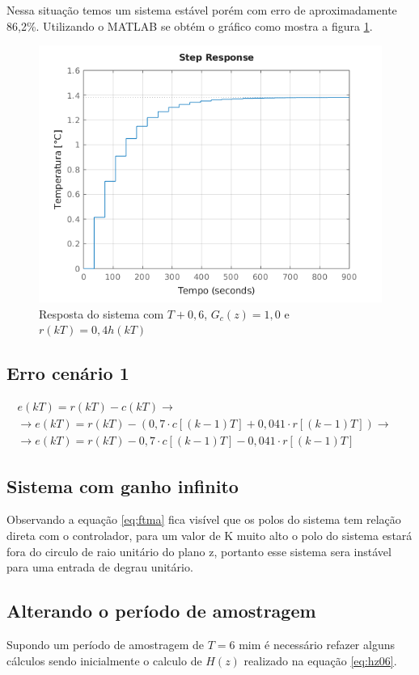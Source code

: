 \documentclass[a4paper,12pt]{article}
\begin{document}
			Nessa situação temos um sistema estável porém com erro de aproximadamente 86,2\%. Utilizando o MATLAB se obtém o gráfico como mostra a figura \ref{fig:resp_2_4}.
			

			\begin{figure}[H]
				\centering
				\includegraphics[width=0.6\linewidth]{images/resp2d.png}
				\caption{Resposta do sistema com $T+0,6$, $G_c(z)=1,0$ e $r(kT) = 0,4 h(kT)$}
				\label{fig:resp_2_4}
			\end{figure}
			
		\subsection{Erro cenário 1}
			
			\begin{equation}
				\left.
				\begin{array}{c}
					\displaystyle e(kT) = r(kT) - c(kT) \rightarrow \\[20pt]
					\displaystyle \rightarrow e(kT) = r(kT) - (0,7\cdot c[(k-1)T] + 0,041 \cdot r[(k-1)T]) \rightarrow \\[20pt]
					\displaystyle \rightarrow e(kT) = r(kT) - 0,7 \cdot c[(k-1)T] - 0,041\cdot r[(k-1)T]
				\end{array}
				\right.
				\quad 
			\end{equation}
			
		\subsection{Sistema com ganho infinito}
			Observando a equação \ref{eq:ftma} fica visível que os polos do sistema tem relação direta com o controlador, para um valor de K muito alto o polo do sistema estará fora do circulo de raio unitário do plano z, portanto esse sistema sera instável para uma entrada de degrau unitário.
		
		\subsection{Alterando o período de amostragem}
			Supondo um período de amostragem de $T=6$ mim é necessário refazer alguns cálculos sendo inicialmente o calculo de $H(z)$ realizado na equação \ref{eq:hz06}.
			
\end{document}
